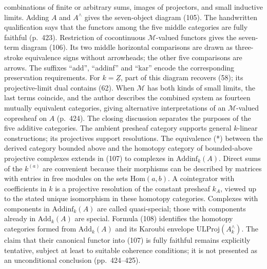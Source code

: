 \documentclass[10pt,oneside]{book}
\begin{document}
combinations of finite or arbitrary sums, images of projectors, and small inductive limits. Adding $A$ and $A^\wedge$ gives the seven-object diagram (105). The handwritten qualification says that the functors among the five middle categories are fully faithful (p.\ 423). Restriction of cocontinuous $\mathcal M$-valued functors gives the seven-term diagram (106). Its two middle horizontal comparisons are drawn as three-stroke equivalence signs without arrowheads; the other five comparisons are arrows. The suffixes ``add'', ``addinf'' and ``kar'' encode the corresponding preservation requirements. For $k=\underline Z$, part of this diagram recovers (58); its projective-limit dual contains (62). When $\mathcal M$ has both kinds of small limits, the last terms coincide, and the author describes the combined system as fourteen mutually equivalent categories, giving alternative interpretations of an $\mathcal M$-valued copresheaf on $A$ (p.\ 424). The closing discussion separates the purposes of the five additive categories. The ambient presheaf category supports general $k$-linear constructions; its projectives support resolutions. The equivalence (*) between the derived category bounded above and the homotopy category of bounded-above projective complexes extends in (107) to complexes in $\mathrm{Addinf}_k(A)$. Direct sums of the $k^{(a)}$ are convenient because their morphisms can be described by matrices with entries in free modules on the sets $\mathrm{Hom}(a,b)$. A cointegrator with coefficients in $k$ is a projective resolution of the constant presheaf $k_A$, viewed up to the stated unique isomorphism in these homotopy categories. Complexes with components in $\mathrm{Addinf}_k(A)$ are called quasi-special; those with components already in $\mathrm{Add}_k(A)$ are special. Formula (108) identifies the homotopy categories formed from $\mathrm{Add}_k(A)$ and its Karoubi envelope $\mathrm{ULProj}(A^\wedge_k)$. The claim that their canonical functor into (107) is fully faithful remains explicitly tentative, subject at least to suitable coherence conditions; it is not presented as an unconditional conclusion (pp.\ 424--425).
\end{document}
